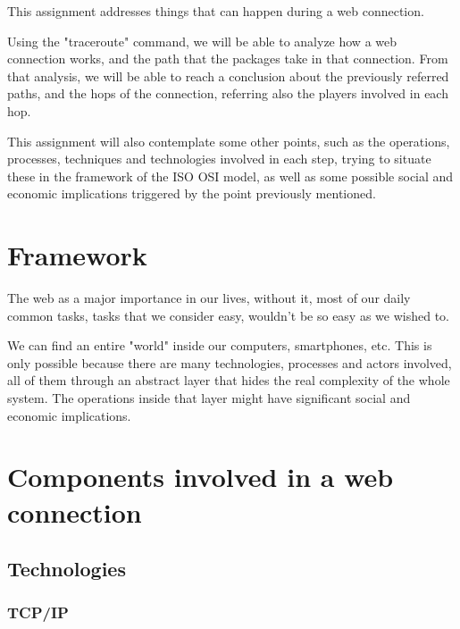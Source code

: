 \documentclass{article}
\newcommand\tab[1][1cm]{\hspace*{#1}}
\begin{document}
\tab This assignment addresses things that can happen during a web connection.

Using the "traceroute" command, we will be able to analyze how a web connection works, and the path that the packages take in that connection.
From that analysis, we will be able to reach a conclusion about the previously referred paths, and the hops of the connection, referring also the players involved in each hop.

This assignment will also contemplate some other points, such as the operations, processes, techniques and technologies involved in each step, trying to situate these in the framework of the ISO OSI model, as well as some possible social and economic implications triggered by the point previously mentioned.

\section{Framework}

The web as a major importance in our lives, without it, most of our daily common tasks, tasks that we consider easy, wouldn't be so easy as we wished to. 

We can find an entire "world" inside our computers, smartphones, etc. This is only possible because there are many technologies, processes and actors involved, all of them through an abstract layer that hides the real complexity of the whole system. The operations inside that layer might have significant social and economic implications.

\section{Components involved in a web connection}

\subsection{Technologies}

\subsubsection{TCP/IP}




\nocite{*}
\printbibliography
\end{document}
